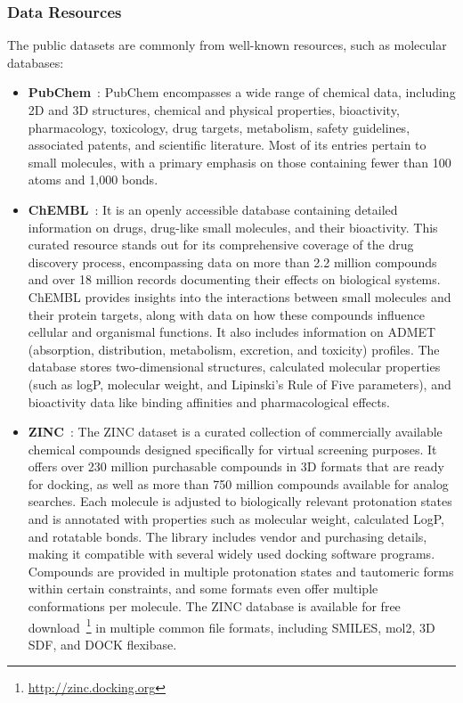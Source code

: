 \subsubsection{Data Resources}
The public datasets are commonly from well-known resources, such as molecular databases: 

\begin{itemize}[leftmargin=*]
\item \textbf{PubChem}~\cite{kim2019pubchem}: PubChem encompasses a wide range of chemical data, including 2D and 3D structures, chemical and physical properties, bioactivity, pharmacology, toxicology, drug targets, metabolism, safety guidelines, associated patents, and scientific literature. Most of its entries pertain to small molecules, with a primary emphasis on those containing fewer than 100 atoms and 1,000 bonds.

\item \textbf{ChEMBL}~\cite{gaulton2012chembl}: It is an openly accessible database containing detailed information on drugs, drug-like small molecules, and their bioactivity. This curated resource stands out for its comprehensive coverage of the drug discovery process, encompassing data on more than 2.2 million compounds and over 18 million records documenting their effects on biological systems.
ChEMBL provides insights into the interactions between small molecules and their protein targets, along with data on how these compounds influence cellular and organismal functions. It also includes information on ADMET (absorption, distribution, metabolism, excretion, and toxicity) profiles. The database stores two-dimensional structures, calculated molecular properties (such as logP, molecular weight, and Lipinski’s Rule of Five parameters), and bioactivity data like binding affinities and pharmacological effects.

\item \textbf{ZINC}~\citep{irwin2005zinc}: The ZINC dataset is a curated collection of commercially available chemical compounds designed specifically for virtual screening purposes. It offers over 230 million purchasable compounds in 3D formats that are ready for docking, as well as more than 750 million compounds available for analog searches. Each molecule is adjusted to biologically relevant protonation states and is annotated with properties such as molecular weight, calculated LogP, and rotatable bonds. The library includes vendor and purchasing details, making it compatible with several widely used docking software programs. Compounds are provided in multiple protonation states and tautomeric forms within certain constraints, and some formats even offer multiple conformations per molecule. The ZINC database is available for free download~\footnote{\href{http://zinc.docking.org}{http://zinc.docking.org}} in multiple common file formats, including SMILES, mol2, 3D SDF, and DOCK flexibase.
\end{itemize}

